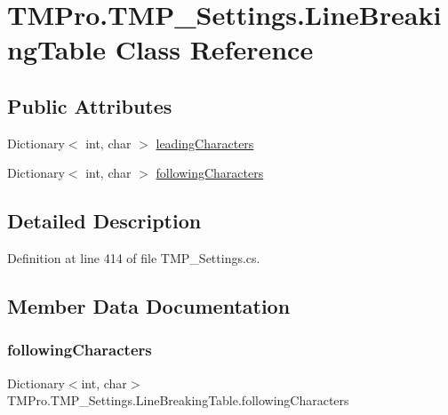 \hypertarget{class_t_m_pro_1_1_t_m_p___settings_1_1_line_breaking_table}{}\section{T\+M\+Pro.\+T\+M\+P\+\_\+\+Settings.\+Line\+Breaking\+Table Class Reference}
\label{class_t_m_pro_1_1_t_m_p___settings_1_1_line_breaking_table}
\subsection*{Public Attributes}
\begin{DoxyCompactItemize}
\item 
Dictionary$<$ int, char $>$ \mbox{\hyperlink{class_t_m_pro_1_1_t_m_p___settings_1_1_line_breaking_table_aae76391a112640f9c636a504ada45dd8}{leading\+Characters}}
\item 
Dictionary$<$ int, char $>$ \mbox{\hyperlink{class_t_m_pro_1_1_t_m_p___settings_1_1_line_breaking_table_a401538d4a99eb674a0afe259bb0339bb}{following\+Characters}}
\end{DoxyCompactItemize}


\subsection{Detailed Description}


Definition at line 414 of file T\+M\+P\+\_\+\+Settings.\+cs.



\subsection{Member Data Documentation}
\mbox{\label{class_t_m_pro_1_1_t_m_p___settings_1_1_line_breaking_table_a401538d4a99eb674a0afe259bb0339bb}} 
\subsubsection{\texorpdfstring{followingCharacters}{followingCharacters}}
{\footnotesize\ttfamily Dictionary$<$int, char$>$ T\+M\+Pro.\+T\+M\+P\+\_\+\+Settings.\+Line\+Breaking\+Table.\+following\+Characters}



